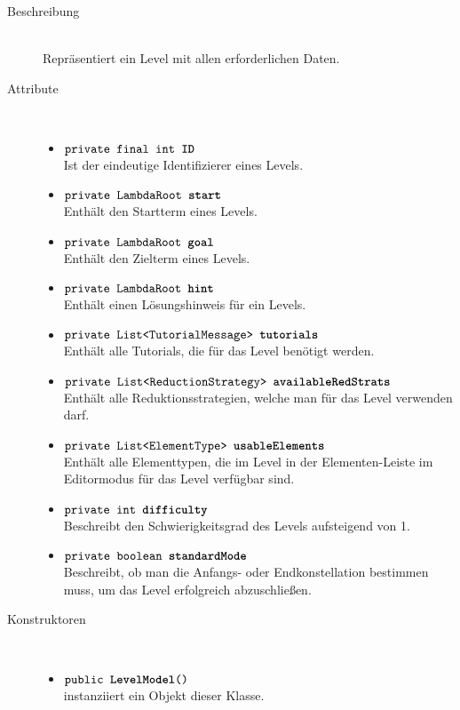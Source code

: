\begin{description}
\item[Beschreibung] \hfill \\ Repräsentiert ein Level mit allen erforderlichen Daten.

\item[Attribute] \hfill \\
	\vspace{-.8cm}
	\begin{itemize}
		\item $\texttt{private final int \textbf{ID}}$ \\ Ist der eindeutige Identifizierer eines Levels.
		\item $\texttt{private LambdaRoot \textbf{start}}$ \\ Enthält den Startterm eines Levels.
		\item $\texttt{private LambdaRoot \textbf{goal}}$ \\ Enthält den Zielterm eines Levels.
		\item $\texttt{private LambdaRoot \textbf{hint}}$ \\ Enthält einen Lösungshinweis für ein Levels.
		\item $\texttt{private List<TutorialMessage> \textbf{tutorials}}$ \\ Enthält alle Tutorials, die für das Level benötigt werden.
		\item $\texttt{private List<ReductionStrategy> \textbf{availableRedStrats}}$ \\ Enthält alle Reduktionsstrategien, welche man für das Level verwenden darf.
		\item $\texttt{private List<ElementType> \textbf{usableElements}}$ \\ Enthält alle Elementtypen, die im Level in der Elementen-Leiste im Editormodus für das Level verfügbar sind.
		\item $\texttt{private int \textbf{difficulty}}$ \\ Beschreibt den Schwierigkeitsgrad des Levels aufsteigend von 1.
		\item $\texttt{private boolean \textbf{standardMode}}$ \\ Beschreibt, ob man die Anfangs- oder Endkonstellation bestimmen muss, um das Level erfolgreich abzuschließen.
		\end{itemize}
	
\item[Konstruktoren] \hfill \\
	\vspace{-.8cm}
	\begin{itemize}
		\item $\texttt{public \textbf{LevelModel}()}$ \\ instanziiert ein Objekt dieser Klasse.


\end{itemize}
\end{description}
